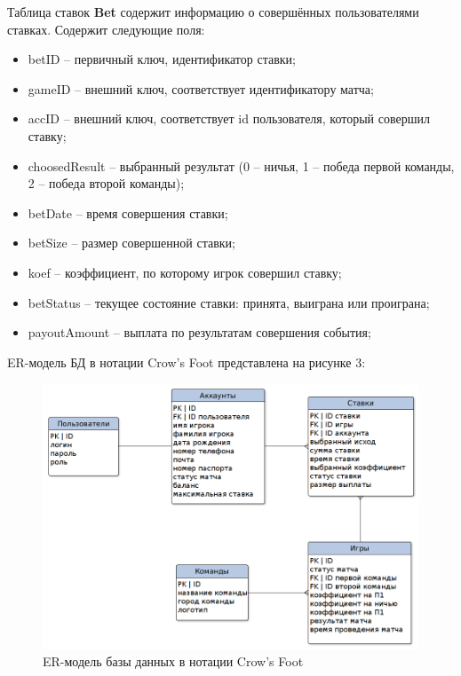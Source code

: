 Таблица ставок \textbf{Bet} содержит информацию о совершённых пользователями ставках.
Содержит следующие поля:
\begin{itemize}
	\item betID -- первичный ключ, идентификатор ставки;
	\item gameID -- внешний ключ, соответствует идентификатору матча;
	\item accID -- внешний ключ, соответствует id пользователя, который совершил ставку;
	\item choosedResult -- выбранный результат (0 -- ничья, 1 -- победа первой команды, 2 -- победа второй команды);
	\item betDate -- время совершения ставки;
	\item betSize -- размер совершенной ставки;
	\item koef -- коэффициент, по которому игрок совершил ставку;
	\item betStatus -- текущее состояние ставки: принята, выиграна или проиграна;
	\item payoutAmount -- выплата по результатам совершения события;
\end{itemize}

\newpage

ER-модель БД в нотации Crow’s Foot представлена на рисунке 3:
\FloatBarrier
\begin{figure}[h]	
	\begin{center}
		\includegraphics[width=\linewidth]{inc/scheme.png}
	\end{center}
	\captionsetup{justification=centering, labelsep=defffis}
	\caption{ER-модель базы данных в нотации Crow’s Foot}
	\label{fig::scheme}
\end{figure}
\FloatBarrier

